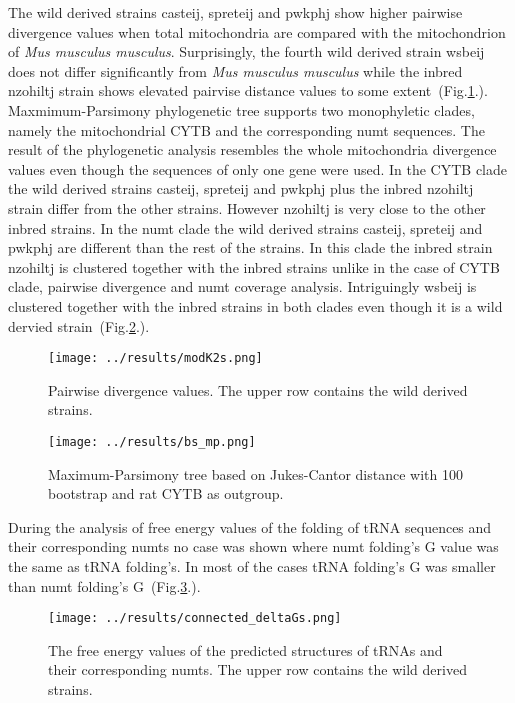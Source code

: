 \documentclass[a4paper,12pt]{article}
\numberwithin{equation}{section} %
\begin{document}
\indent The wild derived strains casteij, spreteij and pwkphj show higher pairwise divergence values when total mitochondria are compared with the mitochondrion of  \textit{Mus musculus musculus}. Surprisingly, the fourth wild derived strain wsbeij does not differ significantly from \textit{Mus musculus musculus} while the inbred nzohiltj strain shows elevated pairvise distance values to some extent~(Fig.\ref{fig:modK2s}.). \\ \indent Maxmimum-Parsimony phylogenetic tree supports two monophyletic clades, namely the mitochondrial CYTB and the corresponding numt sequences. The result of the phylogenetic analysis resembles the whole mitochondria divergence values even though the sequences of only one gene were used. In the CYTB clade the wild derived strains casteij, spreteij and pwkphj plus the inbred nzohiltj strain differ from the other strains. However nzohiltj is very close to the other inbred strains. In the numt clade the wild derived strains casteij, spreteij and pwkphj are different than the rest of the strains. In this clade the inbred strain nzohiltj is clustered together with the inbred strains unlike in the case of CYTB clade, pairwise divergence and numt coverage analysis. Intriguingly wsbeij is clustered together with the inbred strains in both clades even though it is a wild dervied strain~(Fig.\ref{fig:bs_mp}.).
\begin{figure}[H]
    \centering
    \captionsetup{justification=centering}
    \texttt{[image: ../results/modK2s.png]}
    \caption{Pairwise divergence values. The upper row contains the wild derived strains.}
    \label{fig:modK2s}
\end{figure}

\begin{figure}[H]
    \centering
    \captionsetup{justification=centering}
    \texttt{[image: ../results/bs\_mp.png]}
    \caption{Maximum-Parsimony tree based on Jukes-Cantor distance with 100 bootstrap and rat CYTB as outgroup.}
    \label{fig:bs_mp}
\end{figure}

\indent During the analysis of free energy values of the folding of tRNA sequences and their corresponding numts no case was shown where numt folding's \Delta G value was the same as tRNA folding's. In most of the cases tRNA folding's \Delta G was smaller than numt folding's \Delta G~(Fig.\ref{fig:deltaGs}.).
\begin{figure}[H]
    \centering
    \captionsetup{justification=centering}
    \texttt{[image: ../results/connected\_deltaGs.png]}
    \caption{The free energy values of the predicted structures  of tRNAs and their corresponding numts. The upper row contains the wild derived strains.}
    \label{fig:deltaGs}
\end{figure}
\end{document}

